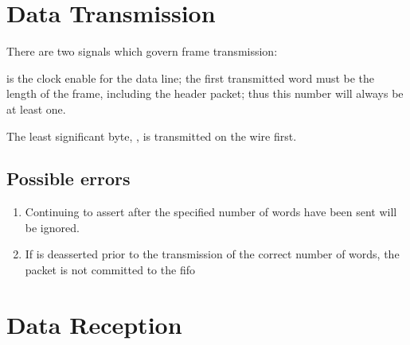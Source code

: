 

\section{Data Transmission}

There are two signals which govern frame transmission: 



 is the clock enable for the data line; the first transmitted
word must be the length of the frame, including the header packet;
thus this number will always be at least one.

The least significant byte, , is transmitted on the
wire first.

\subsection{Possible errors}
\begin{enumerate}
\item Continuing to assert  after the specified
  number of words have been sent will be ignored.
\item If  is deasserted prior to the transmission of the correct number of words, the packet is not committed to the fifo
\end{enumerate}


\section{Data Reception}
